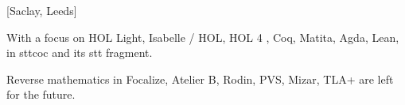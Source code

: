 [Saclay, Leeds]

With a focus on HOL Light, Isabelle / HOL, HOL 4 , Coq,
Matita, Agda, Lean, in sttcoc and its stt fragment.

Reverse mathematics in Focalize, Atelier B, Rodin, PVS, Mizar, TLA+
are left for the future.

